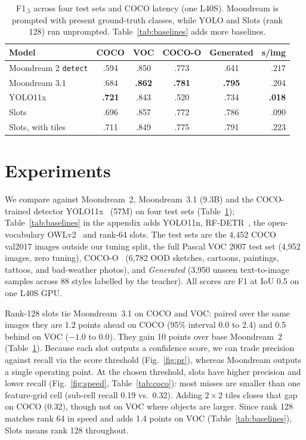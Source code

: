 \documentclass[10pt,twocolumn]{article}
\begin{document}
\begin{table}[t]
\centering\small\setlength{\tabcolsep}{8pt}
\caption{F1$_{.5}$ across four test sets and COCO latency (one L40S). Moondream is
prompted with present ground-truth classes, while YOLO and Slots (rank 128) run
unprompted. Table~\ref{tab:baselines} adds more baselines.}
\label{tab:main}
\begin{tabular}{@{}lccccr@{}}
\toprule
Model & COCO & VOC & COCO-O & Generated & s/img \\
\midrule
Moondream 2 \texttt{detect} & .594 & .850 & .773 & .641 & .217 \\
Moondream 3.1 & .684 & \textbf{.862} & \textbf{.781} & \textbf{.795} & .204 \\
YOLO11x & \textbf{.721} & .843 & .520 & .734 & \textbf{.018} \\
\midrule
\rowcolor{rowtint} Slots & .696 & .857 & .772 & .786 & .090 \\
\rowcolor{rowtint} Slots, with tiles & .711 & .849 & .775 & .791 & .223 \\
\bottomrule
\end{tabular}
\end{table}

\section{Experiments}
We compare against Moondream~2, Moondream~3.1 (9.3B) and the COCO-trained detector
YOLO11x~\citep{yolo11} (57M) on four test sets (Table~\ref{tab:main});
Table~\ref{tab:baselines} in the appendix adds YOLO11n, RF-DETR~\citep{robinson2026rfdetr},
the open-vocabulary OWLv2~\citep{minderer2023owlv2} and rank-64 slots. The test sets are the 4{,}452 COCO
val2017 images outside our tuning split, the full Pascal VOC 2007 test set (4{,}952
images, zero tuning), COCO-O~\citep{mao2023cocoo} (6{,}782 OOD sketches, cartoons,
paintings, tattoos, and bad-weather photos), and \emph{Generated} (3{,}950 unseen
text-to-image samples across 88 styles labelled by the teacher). All scores are F1 at
IoU 0.5 on one L40S GPU.

Rank-128 slots tie Moondream~3.1 on COCO and VOC: paired over the same images they
are 1.2 points ahead on COCO (95\% interval 0.0 to 2.4) and 0.5 behind on VOC ($-1.0$ to
0.0). They gain 10 points over base Moondream~2 (Table~\ref{tab:main}).
Because each slot outputs a confidence score, we can trade precision against recall via
the score threshold (Fig.~\ref{fig:pr}), whereas Moondream outputs a single operating
point. At the chosen threshold, slots have higher precision and lower recall
(Fig.~\ref{fig:speed}, Table~\ref{tab:coco}): most misses are smaller than one feature-grid cell (sub-cell
recall 0.19 vs.\ 0.32). Adding $2\times2$ tiles closes that gap on
COCO (0.32), though not on VOC where objects are larger. Since rank 128 matches rank 64 in
speed and adds 1.4 points on VOC (Table~\ref{tab:baselines}), Slots means rank 128 throughout.
\end{document}
